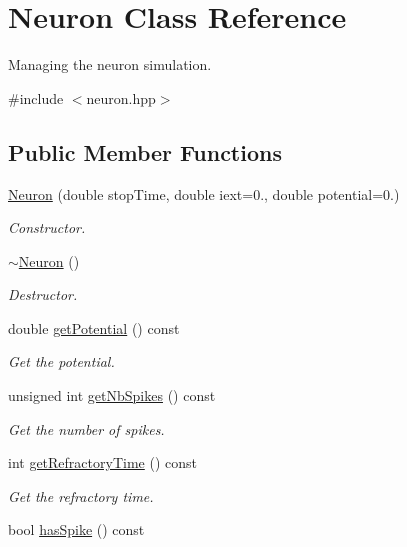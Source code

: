 \hypertarget{classNeuron}{\section{Neuron Class Reference}
\label{classNeuron}
}


Managing the neuron simulation.  




{\ttfamily \#include $<$neuron.\-hpp$>$}

\subsection*{Public Member Functions}
\begin{DoxyCompactItemize}
\item 
\hyperlink{classNeuron_a2aba4407406fe50efd2f23012cfca467}{Neuron} (double stop\-Time, double iext=0., double potential=0.)
\begin{DoxyCompactList}\small\item\em Constructor. \end{DoxyCompactList}\item 
\hyperlink{classNeuron_a94a250ce7e167760e593979b899745b1}{$\sim$\-Neuron} ()
\begin{DoxyCompactList}\small\item\em Destructor. \end{DoxyCompactList}\item 
double \hyperlink{classNeuron_ae2bc004a58621da0d1c51591400ca87d}{get\-Potential} () const 
\begin{DoxyCompactList}\small\item\em Get the potential. \end{DoxyCompactList}\item 
unsigned int \hyperlink{classNeuron_a080fe09731808e0b8210713a7e3fdc3a}{get\-Nb\-Spikes} () const 
\begin{DoxyCompactList}\small\item\em Get the number of spikes. \end{DoxyCompactList}\item 
int \hyperlink{classNeuron_a32e9f0c0bb4bdb3ed8161c199ebe1207}{get\-Refractory\-Time} () const 
\begin{DoxyCompactList}\small\item\em Get the refractory time. \end{DoxyCompactList}\item 
bool \hyperlink{classNeuron_a0567bdec92009aaee9b3aea6b13f95e3}{has\-Spike} () const 

\end{DoxyCompactItemize}

